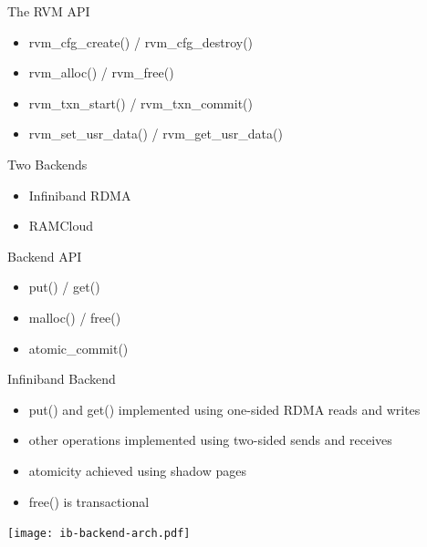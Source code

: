 \documentclass{beamer}
\begin{document}
\begin{frame}{The RVM API}
    \begin{itemize}
        \item rvm\_cfg\_create() / rvm\_cfg\_destroy()
        \item rvm\_alloc() / rvm\_free()
        \item rvm\_txn\_start() / rvm\_txn\_commit()
        \item rvm\_set\_usr\_data() / rvm\_get\_usr\_data()
    \end{itemize}
\end{frame}

\begin{frame}{Two Backends}
    \begin{itemize}
        \item Infiniband RDMA
        \item RAMCloud
    \end{itemize}
\end{frame}

\begin{frame}{Backend API}
    \begin{itemize}
        \item put() / get()
        \item malloc() / free()
        \item atomic\_commit()
    \end{itemize}
\end{frame}

\begin{frame}{Infiniband Backend}
    \begin{itemize}
        \item put() and get() implemented using one-sided RDMA reads and writes
        \item other operations implemented using two-sided sends and receives
        \item atomicity achieved using shadow pages
        \item free() is transactional
    \end{itemize}
    \centering
    \texttt{[image: ib-backend-arch.pdf]}
\end{frame}
\end{document}
